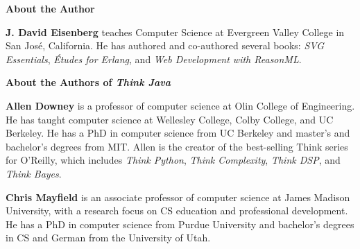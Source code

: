 \documentclass[12pt]{book}
\theoremstyle{exercise}
\begin{document}
\vspace*{40pt}

{\bf\huge About the Author}

{\bf J. David Eisenberg} teaches Computer Science at Evergreen Valley College in San Jos\'e, California. He has authored and co-authored several books: {\it SVG Essentials}, {\it \'Etudes for Erlang}, and {\it Web Development with ReasonML}.

\vspace*{40pt}

{\bf\huge About the Authors of {\em Think Java}}

{\bf Allen Downey} is a professor of computer science at Olin College of Engineering.
He has taught computer science at Wellesley College, Colby College, and UC Berkeley.
He has a PhD in computer science from UC Berkeley and master's and bachelor's degrees from MIT.
Allen is the creator of the best-selling Think series for O'Reilly, which includes {\it Think Python}, {\it Think Complexity}, {\it Think DSP}, and {\it Think Bayes}.

{\bf Chris Mayfield} is an associate professor of computer science at James Madison University, with a research focus on CS education and professional development.
He has a PhD in computer science from Purdue University and bachelor's degrees in CS and German from the University of Utah.

\fi
\end{document}
